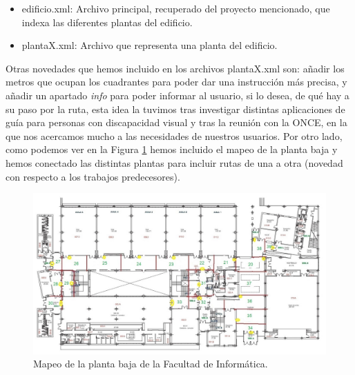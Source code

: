 \begin{itemize}
	\item edificio.xml: Archivo principal, recuperado del proyecto mencionado, que indexa las diferentes plantas del edificio.
	\item plantaX.xml: Archivo que representa una planta del edificio.	
\end{itemize}

Otras novedades que hemos incluido en los archivos plantaX.xml son: añadir los metros que ocupan los cuadrantes para poder dar una instrucción más precisa, y añadir un apartado \textit{info} para poder informar al usuario, si lo desea, de qué hay a su paso por la ruta, esta idea la tuvimos tras investigar distintas aplicaciones de guía para personas con discapacidad visual y tras la reunión con la ONCE, en la que nos acercamos mucho a las necesidades de nuestros usuarios. Por otro lado, como podemos ver en la Figura \ref{fig:cuadrantesPbaja} hemos incluido el mapeo de la planta baja y hemos conectado las distintas plantas para incluir rutas de una a otra (novedad con respecto a los trabajos predecesores).

\begin{figure}[t]
	\centering
	\includegraphics[width=1\textwidth]{Imagenes/Descripciondeltrabajo/mapaplantabaja_cuadrantes3}
	\caption{Mapeo de la planta baja de la Facultad de Informática.}
	\label{fig:cuadrantesPbaja}
\end{figure}

